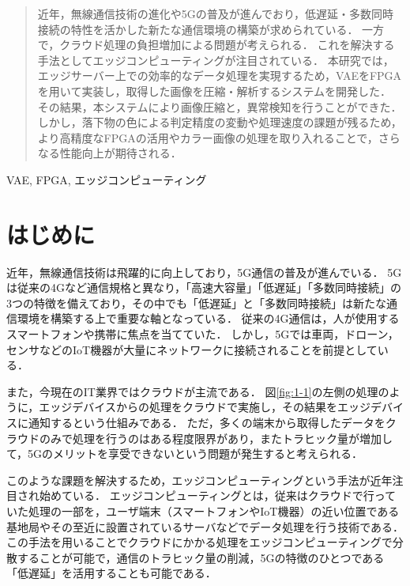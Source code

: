 \documentclass[paper]{ieicej}
\begin{document}
\begin{abstract}
近年，無線通信技術の進化や5Gの普及が進んでおり，低遅延・多数同時接続の特性を活かした新たな通信環境の構築が求められている．
一方で，クラウド処理の負担増加による問題が考えられる．
これを解決する手法としてエッジコンピューティングが注目されている．
本研究では，エッジサーバー上での効率的なデータ処理を実現するため，VAEをFPGAを用いて実装し，取得した画像を圧縮・解析するシステムを開発した．
その結果，本システムにより画像圧縮と，異常検知を行うことができた．
しかし，落下物の色による判定精度の変動や処理速度の課題が残るため，より高精度なFPGAの活用やカラー画像の処理を取り入れることで，さらなる性能向上が期待される．
\end{abstract}
\begin{keyword}
VAE, FPGA, エッジコンピューティング
\end{keyword}
\maketitle

\section{はじめに}
近年，無線通信技術は飛躍的に向上しており，5G通信の普及が進んでいる．
5Gは従来の4Gなど通信規格と異なり，「高速大容量」「低遅延」「多数同時接続」の3つの特徴を備えており，その中でも「低遅延」と「多数同時接続」は新たな通信環境を構築する上で重要な軸となっている\cite{5g}．
従来の4G通信は，人が使用するスマートフォンや携帯に焦点を当てていた．
しかし，5Gでは車両，ドローン，センサなどのIoT機器が大量にネットワークに接続されることを前提としている．

また，今現在のIT業界ではクラウドが主流である\cite{jyotu-haku}．
図\ref{fig:1-1}の左側の処理のように，エッジデバイスからの処理をクラウドで実施し，その結果をエッジデバイスに通知するという仕組みである．
ただ，多くの端末から取得したデータをクラウドのみで処理を行うのはある程度限界があり，またトラヒック量が増加して，5Gのメリットを享受できないという問題が発生すると考えられる．

このような課題を解決するため，エッジコンピューティングという手法が近年注目され始めている．
エッジコンピューティングとは，従来はクラウドで行っていた処理の一部を，ユーザ端末（スマートフォンやIoT機器）の近い位置である基地局やその至近に設置されているサーバなどでデータ処理を行う技術である\cite{edge-com}\cite{nec-edge}．
この手法を用いることでクラウドにかかる処理をエッジコンピューティングで分散することが可能で，通信のトラヒック量の削減，5Gの特徴のひとつである「低遅延」を活用することも可能である．
\end{document}
